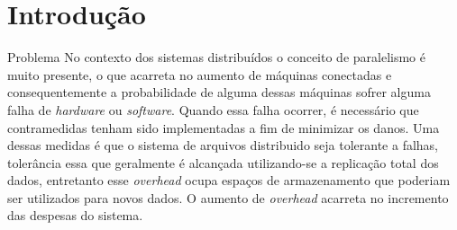 \section{Introdução}

\begin{frame}{Problema}
	No contexto dos sistemas distribuídos o conceito de paralelismo é muito presente, o que acarreta no aumento de máquinas conectadas e consequentemente a probabilidade de alguma dessas máquinas sofrer alguma falha de \textit{hardware} ou \textit{software}. Quando essa falha ocorrer, é necessário que contramedidas tenham sido implementadas a fim de minimizar os danos. Uma dessas medidas é que o sistema de arquivos distribuido seja tolerante a falhas, tolerância essa que geralmente é alcançada utilizando-se a replicação total dos dados, entretanto esse \textit{overhead} ocupa espaços de armazenamento que poderiam ser utilizados para novos dados. O aumento de \textit{overhead} acarreta no incremento das despesas do sistema.
\end{frame}